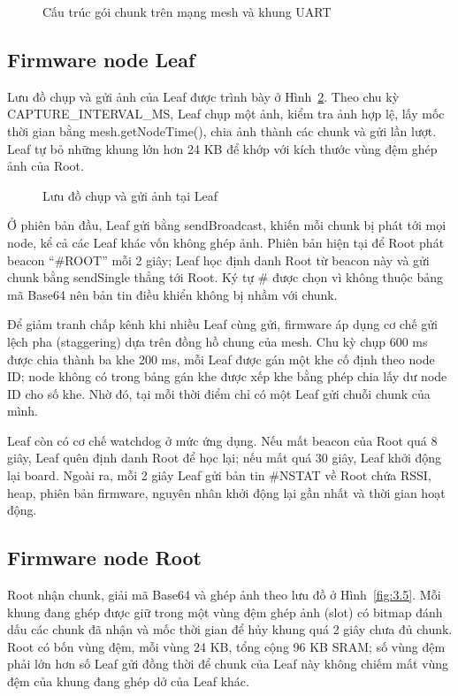 \begin{figure}[!htbp]
\centering

\caption{Cấu trúc gói chunk trên mạng mesh và khung UART}\label{fig:3.3}
\end{figure}


\subsection{Firmware node Leaf}

Lưu đồ chụp và gửi ảnh của Leaf được trình bày ở Hình~\ref{fig:3.4}. Theo chu kỳ CAPTURE\_INTERVAL\_MS, Leaf chụp một ảnh, kiểm tra ảnh hợp lệ, lấy mốc thời gian bằng mesh.getNodeTime(), chia ảnh thành các chunk và gửi lần lượt. Leaf tự bỏ những khung lớn hơn 24 KB để khớp với kích thước vùng đệm ghép ảnh của Root.


\begin{figure}[!htbp]
\centering

\caption{Lưu đồ chụp và gửi ảnh tại Leaf}\label{fig:3.4}
\end{figure}

Ở phiên bản đầu, Leaf gửi bằng sendBroadcast, khiến mỗi chunk bị phát tới mọi node, kể cả các Leaf khác vốn không ghép ảnh. Phiên bản hiện tại để Root phát beacon “\#ROOT” mỗi 2 giây; Leaf học định danh Root từ beacon này và gửi chunk bằng sendSingle thẳng tới Root. Ký tự \# được chọn vì không thuộc bảng mã Base64 nên bản tin điều khiển không bị nhầm với chunk.

Để giảm tranh chấp kênh khi nhiều Leaf cùng gửi, firmware áp dụng cơ chế gửi lệch pha (staggering) dựa trên đồng hồ chung của mesh. Chu kỳ chụp 600 ms được chia thành ba khe 200 ms, mỗi Leaf được gán một khe cố định theo node ID; node không có trong bảng gán khe được xếp khe bằng phép chia lấy dư node ID cho số khe. Nhờ đó, tại mỗi thời điểm chỉ có một Leaf gửi chuỗi chunk của mình.

Leaf còn có cơ chế watchdog ở mức ứng dụng. Nếu mất beacon của Root quá 8 giây, Leaf quên định danh Root để học lại; nếu mất quá 30 giây, Leaf khởi động lại board. Ngoài ra, mỗi 2 giây Leaf gửi bản tin \#NSTAT về Root chứa RSSI, heap, phiên bản firmware, nguyên nhân khởi động lại gần nhất và thời gian hoạt động.


\subsection{Firmware node Root}\label{subsec:3.3.3}

Root nhận chunk, giải mã Base64 và ghép ảnh theo lưu đồ ở Hình~\ref{fig:3.5}. Mỗi khung đang ghép được giữ trong một vùng đệm ghép ảnh (slot) có bitmap đánh dấu các chunk đã nhận và mốc thời gian để hủy khung quá 2 giây chưa đủ chunk. Root có bốn vùng đệm, mỗi vùng 24 KB, tổng cộng 96 KB SRAM; số vùng đệm phải lớn hơn số Leaf gửi đồng thời để chunk của Leaf này không chiếm mất vùng đệm của khung đang ghép dở của Leaf khác.


